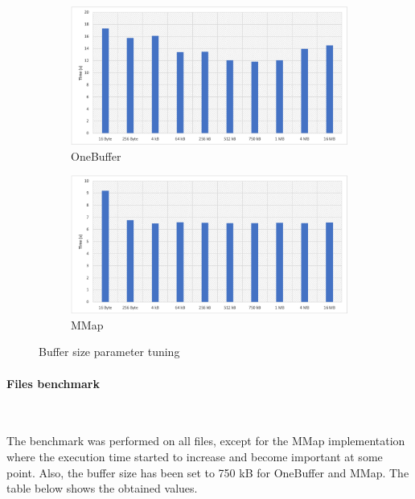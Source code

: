 \documentclass[12pt]{article}
\begin{document}
\begin{figure}[H] 
\begin{adjustwidth}{-3.5cm}{-3.5cm}
  \begin{subfigure}[b]{0.5\linewidth}
    \centering
    \includegraphics[width=0.99\linewidth]{images/oneBuffer-length.png} 
    \caption{OneBuffer} 
    \label{fig:2a} 
    \vspace{4ex}
  \end{subfigure}%
  \begin{subfigure}[b]{0.5\linewidth}
    \centering
    \includegraphics[width=0.99\linewidth]{images/MMap-length.png} 
    \caption{MMap} 
    \label{fig:2b} 
    \vspace{4ex}
  \end{subfigure} 
  \caption{Buffer size parameter tuning}
  \label{fig:2} 
\end{adjustwidth}
\end{figure}
\paragraph{Files benchmark}\mbox{}\\
\par The benchmark was performed on all files, except for the MMap implementation where the execution time started to increase and become important at some point. Also, the buffer size has been set to 750 kB for OneBuffer and MMap. The table below shows the obtained values.
\end{document}
